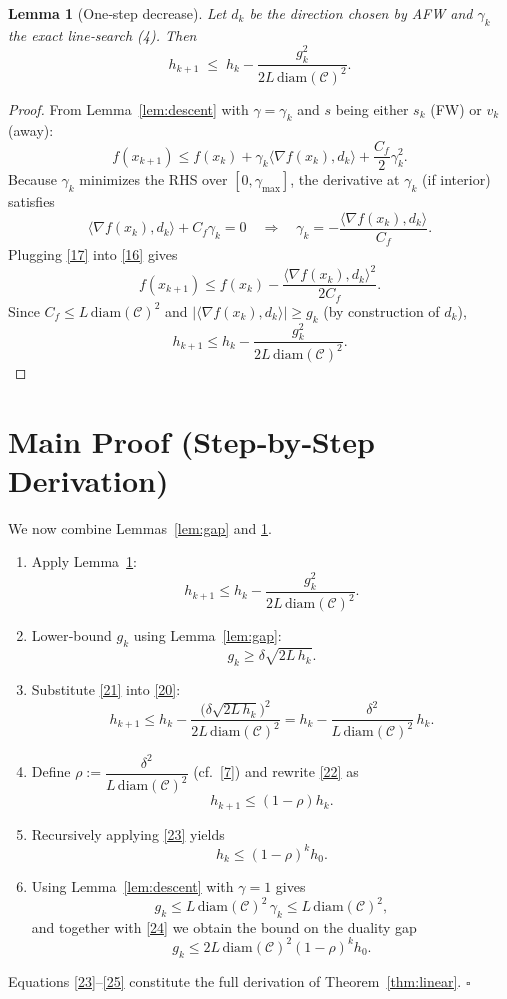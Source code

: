 \documentclass{article}
\newtheorem{lemma}{Lemma}
\newcommand{\C}{\mathcal{C}}
\newcommand{\diam}{\mathrm{diam}}
\newcommand{\curv}{C_f}
\begin{document}
\begin{lemma}[One‑step decrease]\label{lem:onestep}
Let $d_k$ be the direction chosen by AFW and $\gamma_k$ the exact line‑search (4). Then
\[
h_{k+1}\;\le\;h_k-\frac{g_k^{2}}{2L\,\diam(\C)^{2}} .
\tag{15}
\]
\end{lemma}
\begin{proof}
From Lemma~\ref{lem:descent} with $\gamma=\gamma_k$ and $s$ being either $s_k$ (FW) or $v_k$ (away):
\[
f(x_{k+1})\le f(x_k)+\gamma_k\langle\nabla f(x_k),d_k\rangle
+\frac{\curv}{2}\gamma_k^{2}.
\tag{16}
\]
Because $\gamma_k$ minimizes the RHS over $[0,\gamma_{\max}]$, the derivative at $\gamma_k$ (if interior) satisfies
\[
\langle\nabla f(x_k),d_k\rangle+\curv\gamma_k=0
\quad\Longrightarrow\quad
\gamma_k=-\frac{\langle\nabla f(x_k),d_k\rangle}{\curv}.
\tag{17}
\]
Plugging \eqref{17} into \eqref{16} gives
\[
f(x_{k+1})\le f(x_k)-\frac{\langle\nabla f(x_k),d_k\rangle^{2}}{2\curv}.
\tag{18}
\]
Since $\curv\le L\,\diam(\C)^{2}$ and $|\langle\nabla f(x_k),d_k\rangle|\ge g_k$ (by construction of $d_k$),
\[
h_{k+1}\le h_k-\frac{g_k^{2}}{2L\,\diam(\C)^{2}} .
\tag{19}
\]
\end{proof}

\section*{Main Proof (Step‑by‑Step Derivation)}\label{sec:proof}
We now combine Lemmas~\ref{lem:gap} and \ref{lem:onestep}.

\begin{enumerate}
\item[Step 1.] Apply Lemma~\ref{lem:onestep}:
\[
h_{k+1}\le h_k-\frac{g_k^{2}}{2L\,\diam(\C)^{2}} .
\tag{20}
\]
\item[Step 2.] Lower‑bound $g_k$ using Lemma~\ref{lem:gap}:
\[
g_k\ge\delta\sqrt{2L\,h_k}.
\tag{21}
\]
\item[Step 3.] Substitute \eqref{21} into \eqref{20}:
\[
h_{k+1}\le h_k-
\frac{\bigl(\delta\sqrt{2L\,h_k}\bigr)^{2}}{2L\,\diam(\C)^{2}}
= h_k-\frac{\delta^{2}}{L\,\diam(\C)^{2}}\,h_k .
\tag{22}
\]
\item[Step 4.] Define $\rho:=\dfrac{\delta^{2}}{L\,\diam(\C)^{2}}$ (cf.~\eqref{7}) and rewrite \eqref{22} as
\[
h_{k+1}\le (1-\rho)h_k .
\tag{23}
\]
\item[Step 5.] Recursively applying \eqref{23} yields
\[
h_k\le (1-\rho)^{k}h_0 .
\tag{24}
\]
\item[Step 6.] Using Lemma~\ref{lem:descent} with $\gamma=1$ gives
\[
g_k\le L\,\diam(\C)^{2}\,\gamma_k\le L\,\diam(\C)^{2},
\]
and together with \eqref{24} we obtain the bound on the duality gap
\[
g_k\le 2L\,\diam(\C)^{2}(1-\rho)^{k}h_0 .
\tag{25}
\]
\end{enumerate}
Equations \eqref{23}–\eqref{25} constitute the full derivation of Theorem~\ref{thm:linear}. $\square$
\end{document}
